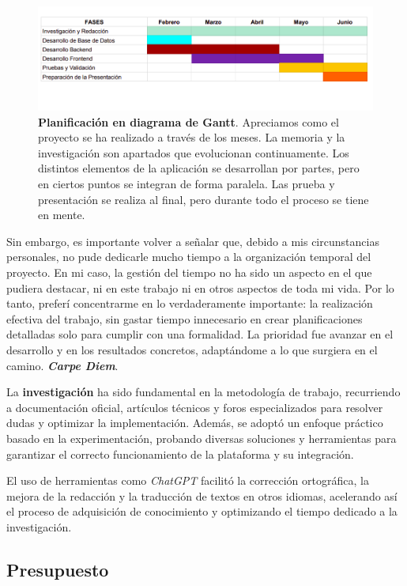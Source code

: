 \begin{figure}[H]
	\centering
	\includegraphics[width=1\linewidth]{imagenes/diagrama.png}
	\caption[\textbf{Planificación en diagrama de Gantt}.]{\textbf{Planificación en diagrama de Gantt}. Apreciamos como el proyecto se ha realizado a través de los meses. La memoria y la investigación son apartados que evolucionan continuamente. Los distintos elementos de la aplicación se desarrollan por partes, pero en ciertos puntos se integran de forma paralela. Las prueba y presentación se realiza al final, pero durante todo el proceso se tiene en mente.}
	\label{diagrama}
\end{figure}

Sin embargo, es importante volver a señalar que, debido a mis circunstancias personales, no pude dedicarle mucho tiempo a la organización temporal del proyecto. En mi caso, la gestión del tiempo no ha sido un aspecto en el que pudiera destacar, ni en este trabajo ni en otros aspectos de toda mi vida. Por lo tanto, preferí concentrarme en lo verdaderamente importante: la realización efectiva del trabajo, sin gastar tiempo innecesario en crear planificaciones detalladas solo para cumplir con una formalidad. La prioridad fue avanzar en el desarrollo y en los resultados concretos, adaptándome a lo que surgiera en el camino. \textit{\textbf{Carpe Diem}}.


La \textbf{investigación} ha sido fundamental en la metodología de trabajo, recurriendo a documentación oficial, artículos técnicos y foros especializados para resolver dudas y optimizar la implementación. Además, se adoptó un enfoque práctico basado en la experimentación, probando diversas soluciones y herramientas para garantizar el correcto funcionamiento de la plataforma y su integración.

El uso de herramientas como \textit{ChatGPT} facilitó la corrección ortográfica, la mejora de la redacción y la traducción de textos en otros idiomas, acelerando así el proceso de adquisición de conocimiento y optimizando el tiempo dedicado a la investigación.

\subsection{Presupuesto}

